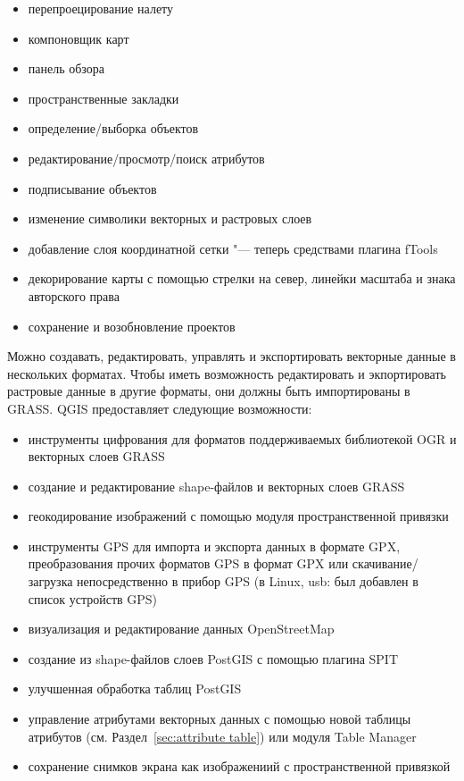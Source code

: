 \begin{itemize}[label=--]
\item перепроецирование налету
\item компоновщик карт
\item панель обзора
\item пространственные закладки
\item определение/выборка объектов
\item редактирование/просмотр/поиск атрибутов
\item подписывание объектов
\item изменение символики векторных и растровых слоев
\item добавление слоя координатной сетки "--- теперь средствами плагина
fTools
\item декорирование карты с помощью стрелки на север, линейки масштаба
и знака авторского права
\item сохранение и возобновление проектов
\end{itemize}


Можно создавать, редактировать, управлять и экспортировать векторные
данные в нескольких форматах. Чтобы иметь возможность редактировать и
экпортировать растровые данные в другие форматы, они должны быть
импортированы в GRASS. QGIS предоставляет следующие возможности:

\begin{itemize}[label=--]
\item инструменты цифрования для форматов поддерживаемых библиотекой OGR
и векторных слоев GRASS
\item создание и редактирование shape-файлов и векторных слоев GRASS
\item геокодирование изображений с помощью модуля пространственной
привязки
\item инструменты GPS для импорта и экспорта данных в формате GPX,
преобразования прочих форматов GPS в формат GPX или скачивание/загрузка
непосредственно в прибор GPS (в Linux, usb: был добавлен в список
устройств GPS)
\item визуализация и редактирование данных OpenStreetMap
\item создание из shape-файлов слоев PostGIS с помощью плагина SPIT
\item улучшенная обработка таблиц PostGIS
\item управление атрибутами векторных данных с помощью новой таблицы
атрибутов (см. Раздел~\ref{sec:attribute table}) или модуля Table Manager
\item сохранение снимков экрана как изображениий с пространственной
привязкой
\end{itemize}

